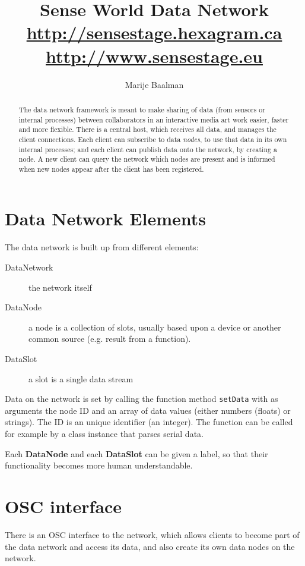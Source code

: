 \documentclass[letterpaper,10pt]{article}
\title{Sense World Data Network\\ \url{http://sensestage.hexagram.ca} \\ \url{http://www.sensestage.eu}  }
\author{Marije Baalman}
\begin{document}

\maketitle

\begin{abstract}
The data network framework is meant to make sharing of data (from sensors or internal processes) between collaborators in an interactive media art work easier, faster and more flexible. There is a central host, which receives all data, and manages the client connections. Each client can subscribe to data \textit{nodes}, to use that data in its own internal processes; and each client can publish data onto the network, by creating a node. A new client can query the network which nodes are present and is informed when new nodes appear after the client has been registered.
\end{abstract}

\section{Data Network Elements}

The data network is built up from different elements:
\begin{description}
 \item [DataNetwork] the network itself
 \item [DataNode] a node is a collection of slots, usually based upon a device or another common source (e.g. result from a function).
 \item [DataSlot] a slot is a single data stream
\end{description}

Data on the network is set by calling the function method \verb|setData| with as arguments the node ID and an array of data values (either numbers (floats) or strings). The ID is an unique identifier (an integer). The function can be called for example by a class instance that parses serial data.

Each \textbf{DataNode} and each \textbf{DataSlot} can be given a label, so that their functionality becomes more human understandable.

\section{OSC interface}
There is an OSC interface to the network, which allows clients to become part of the data network and access its data, and also create its own data nodes on the network.
\end{document}
